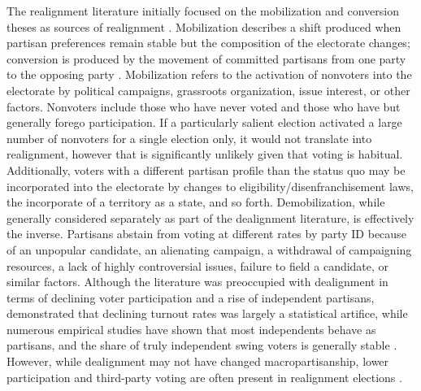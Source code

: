 The realignment literature initially focused on the mobilization and conversion theses as sources of realignment \citep{campbell_american_1960}. Mobilization describes a shift produced when partisan preferences remain stable but the composition of the electorate changes; conversion is produced by the movement of committed partisans from one party to the opposing party \citep{andersen_after_1996, darmofal_dynamics_2010}. Mobilization refers to the activation of nonvoters into the electorate by political campaigns, grassroots organization, issue interest, or other factors. Nonvoters include those who have never voted and those who have but generally forego participation. If a particularly salient election activated a large number of nonvoters for a single election only, it would not translate into realignment, however that is significantly unlikely given that voting is habitual. Additionally, voters with a different partisan profile than the status quo may be incorporated into the electorate by changes to eligibility/disenfranchisement laws, the incorporate of a territory as a state, and so forth. Demobilization, while generally considered separately as part of the dealignment literature, is effectively the inverse. Partisans abstain from voting at different rates by party ID because of an unpopular candidate, an alienating campaign, a withdrawal of campaigning resources, a lack of highly controversial issues, failure to field a candidate, or similar factors. Although the literature was preoccupied with dealignment in terms of declining voter participation and a rise of independent partisans, \citet{mcdonald_myth_2001} demonstrated that declining turnout rates was largely a statistical artifice, while numerous empirical studies have shown that most independents behave as partisans, and the share of truly independent swing voters is generally stable \citep{keith_partisan_1986}. However, while dealignment may not have changed macropartisanship, lower participation and third-party voting are often present in realignment elections  \citep{stanley_partisan_1988, hammond_minor_1976}.

